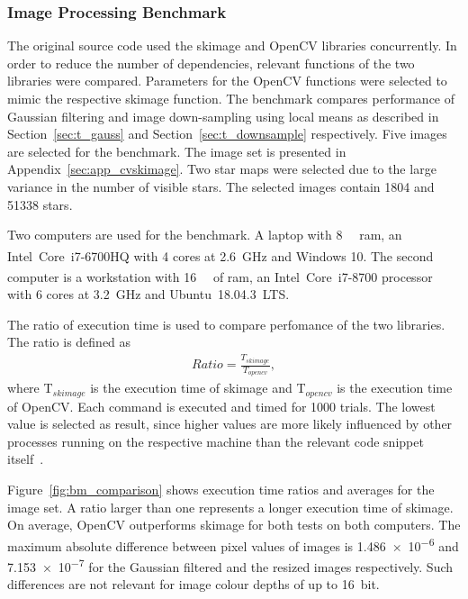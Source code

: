 \subsubsection{Image Processing Benchmark} \label{sec:cvskimage}
The original source code used the \gls{skimage} and OpenCV libraries concurrently. In order to reduce the number of dependencies, relevant functions of the two libraries were compared. Parameters for the OpenCV functions were selected to mimic the respective \gls{skimage} function. The benchmark compares performance of Gaussian filtering and image down-sampling using local means as described in Section~\ref{sec:t_gauss} and Section~\ref{sec:t_downsample} respectively. Five images are selected for the benchmark. The image set is presented in Appendix~\ref{sec:app_cvskimage}. Two star maps were selected due to the large variance in the number of visible stars. The selected images contain 1804 and 51338 stars.

Two computers are used for the benchmark. A laptop with \SI{8}{\giga\byte} \gls{ram}, an Intel\textsuperscript{\textregistered}~Core\texttrademark~i7-6700HQ with \SI{4}{} cores at \SI{2.6}{\giga\hertz} and Windows 10. The second computer is a workstation with \SI{16}{\giga\byte} of \gls{ram}, an Intel\textsuperscript{\textregistered}~Core\texttrademark~i7-8700 processor with \SI{6}{} cores at \SI{3.2}{\giga\hertz} and Ubuntu~18.04.3~LTS.

The ratio of execution time is used to compare perfomance of the two libraries. The ratio is defined as
\begin{align}
    Ratio = \frac{T_{skimage}}{T_{opencv}}, \label{eq:bm_exec_ratio}
\end{align}
where \gls{T}$_{skimage}$ is the execution time of \gls{skimage} and \gls{T}$_{opencv}$ is the execution time of OpenCV. Each command is executed and timed for 1000 trials. The lowest value is selected as result, since higher values are more likely influenced by other processes running on the respective machine than the relevant code snippet itself~\cite{timeit2020}.

Figure~\ref{fig:bm_comparison} shows execution time ratios and averages for the image set. A ratio larger than one represents a longer execution time of \gls{skimage}. On average, OpenCV outperforms \gls{skimage} for both tests on both computers. The maximum absolute difference between pixel values of images is \SI{1.486e-6}{} and \SI{7.153e-7}{} for the Gaussian filtered and the resized images respectively. Such differences are not relevant for image colour depths of up to \SI{16}{bit}.

